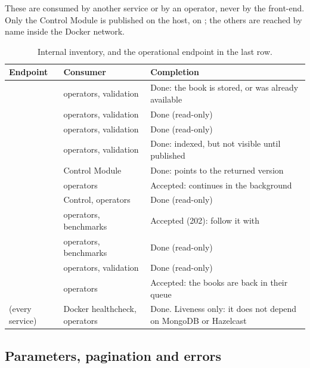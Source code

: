 These are consumed by another service or by an operator, never by the front-end. Only the Control Module
is published on the host, on ; the others are reached by name inside the Docker network.

\begin{table}[H]
\centering\small
\begin{tabularx}{\linewidth}{@{}L{4.9cm}L{2.4cm}X@{}}
\toprule
\textbf{Endpoint} & \textbf{Consumer} & \textbf{Completion} \\
\midrule
{} & operators, validation & Done: the book is stored, or was already available \\
 & operators, validation & Done (read-only) \\
 & operators, validation & Done (read-only) \\
 & operators, validation & Done: indexed, but not visible until published \\
 & Control Module & Done:  points to the returned version \\
 & operators & Accepted: continues in the background \\
 & Control, operators & Done (read-only) \\
 & operators, benchmarks & Accepted (202): follow it with  \\
 & operators, benchmarks & Done (read-only) \\
 & operators, validation & Done (read-only) \\
 & operators & Accepted: the books are back in their queue \\
\midrule
{} (every service) & Docker healthcheck, operators & Done. Liveness only: it does not depend on MongoDB or Hazelcast \\
\bottomrule
\end{tabularx}
\caption{Internal inventory, and the operational endpoint in the last row.}
\end{table}

\subsection{Parameters, pagination and errors}

